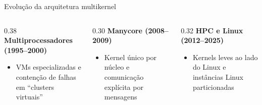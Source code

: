 \documentclass[aspectratio=169]{beamer}
\begin{document}
{\begin{frame}{Evolução da arquitetura multikernel}
            \vspace{8mm}
            \begin{columns}[T]
                \begin{column}{0.38\textwidth}
                    \textbf{\small Multiprocessadores (1995--2000)}\\[1pt] %
                    \setlength{\leftmargini}{1em}\begin{itemize}\item VMs especializadas e contenção de falhas em ``clusters virtuais''\end{itemize}
                \end{column}
                \begin{column}{0.30\textwidth}
                    \textbf{\small Manycore (2008--2009)}\\[1pt] %
                    \setlength{\leftmargini}{1em}\begin{itemize}\item Kernel único por núcleo e comunicação explícita por mensagens\end{itemize}
                \end{column}
                \begin{column}{0.32\textwidth}
                    \textbf{\small HPC e Linux (2012--2025)}\\[1pt] %
                    \setlength{\leftmargini}{1em}\begin{itemize}\item Kernels leves ao lado do Linux e instâncias Linux particionadas\end{itemize}
                \end{column}
            \end{columns}

        \end{frame}

}
\end{document}
